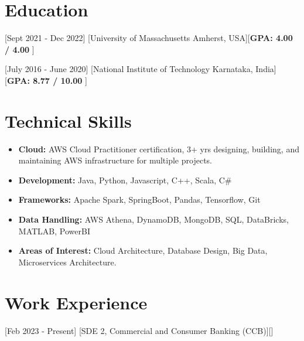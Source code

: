 \documentclass{article}
\begin{document}

\makecvtitle %


\section{Education}

[Sept 2021 - Dec 2022]
[University of Massachusetts Amherst, USA][\textbf{GPA: 4.00 / 4.00 }]

[July 2016 - June 2020]
[National Institute of Technology Karnataka, India] [\textbf{GPA: 8.77 / 10.00 }]


\section{Technical Skills}

\begin{itemize}
\item \textbf{Cloud:} AWS Cloud Practitioner certification, 3+ yrs designing, building, and maintaining AWS infrastructure for multiple projects. 
\item \textbf{Development:} Java, Python, Javascript, C++, Scala, C\#
\item \textbf{Frameworks:} Apache Spark, SpringBoot, Pandas, Tensorflow, Git
\item \textbf{Data Handling:} AWS Athena, DynamoDB, MongoDB, SQL, DataBricks, MATLAB, PowerBI
\item \textbf{Areas of Interest:} Cloud Architecture, Database Design, Big Data, Microservices Architecture.

\end{itemize}


\section{Work Experience}

[Feb 2023 - Present]
[SDE 2, Commercial and Consumer Banking (CCB)][]
\end{document}
